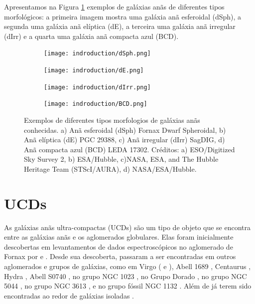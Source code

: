 Apresentamos na Figura \ref{dwarf_galaxies} exemplos de galáxias anãs de diferentes tipos morfológicos: a primeira imagem mostra uma galáxia anã esferoidal (dSph), a segunda uma galáxia anã elíptica (dE), a terceira uma galáxia anã irregular (dIrr) e a quarta uma galáxia anã compacta azul (BCD).


\begin{figure}[!ht]
    \centering
    \captionsetup{justification=centering}
    \begin{subfigure}[b]{0.33\textwidth}
        \texttt{[image: indroduction/dSph.png]}
        \caption{}
    \end{subfigure}
    \begin{subfigure}[b]{0.33\textwidth}
        \texttt{[image: indroduction/dE.png]}
        \caption{}
    \end{subfigure}
    \begin{subfigure}[b]{0.33\textwidth}
        \texttt{[image: indroduction/dIrr.png]}
        \caption{}
    \end{subfigure}
    \begin{subfigure}[b]{0.33\textwidth}
        \texttt{[image: indroduction/BCD.png]}
        \caption{}
    \end{subfigure}
    \caption{Exemplos de diferentes tipos morfologios de galáxias anãs conhecidas. a) Anã esferoidal (dSph) Fornax Dwarf Spheroidal, b) Anã elíptica (dE) PGC 29388, c) Anã irregular (dIrr) SagDIG, d) Anã compacta azul (BCD) LEDA 17302. Créditos: a) ESO/Digitized Sky Survey 2, b) ESA/Hubble, c)NASA, ESA, and The Hubble Heritage Team (STScI/AURA), d) NASA/ESA/Hubble.}
    \label{dwarf_galaxies}
\end{figure}


\section{UCDs}\label{sec:UCDs}
As galáxias anãs ultra-compactas (UCDs) são um tipo de objeto que se encontra entre as galáxias anãs e os aglomerados globulares. Elas foram inicialmente descobertas em levantamentos de dados espectroscópicos no aglomerado de Fornax por \citealp{Drinkwater_2000} e \citealp{Hilker_1999}. Desde sua descoberta, passaram a ser encontradas em outros aglomerados e grupos de galáxias, como em Virgo (\citealp{Hasegan_2005} e \citealp{Liu_2020}), Abell 1689 \citep{Mieske_2005}, Centaurus \citep{Mieske_2007}, Hydra \citep{Wehner_Harris_2007}, Abell S0740 \citep{Blakeslee_DeGraaff2008}, no grupo NGC 1023 \citep{Mieske_West_Oliveira_2007}, no Grupo Dorado \citep{Evstigneeva_2007}, no grupo NGC 5044 \citep{Faifer_2017}, no grupo NGC 3613 \citep{Bortoli_2020}, e no grupo fóssil NGC 1132 \citep{Madrid_2011}. Além de já terem sido encontradas ao redor de galáxias isoladas \citep{Hau_2009}.

